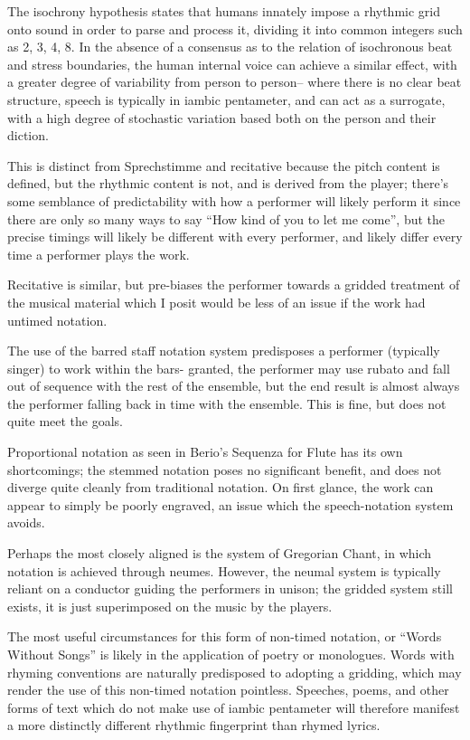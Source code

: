 The isochrony hypothesis states that humans innately impose a rhythmic grid onto sound in order to parse and process it, dividing it into common integers such as 2, 3, 4, 8. 
In the absence of a consensus as to the relation of isochronous beat and stress boundaries, the human internal voice can achieve a similar effect, with a greater degree of variability from person to person-- 
where there is no clear beat structure, speech is typically in iambic pentameter, and can act as a surrogate, with a high degree of stochastic variation based both on the person and their diction. 

This is distinct from Sprechstimme and recitative because the pitch content is defined, but the rhythmic content is not, and is derived from the player; 
there's some semblance of predictability with how a performer will likely perform it since there are only so many ways to say ``How kind of you to let me come'', but the precise timings will likely be different with every performer, and likely differ every time a performer plays the work. 

Recitative is similar, but pre-biases the performer towards a gridded treatment of the musical material which I posit would be less of an issue if the work had untimed notation. 

The use of the barred staff notation system predisposes a performer (typically singer) to work within the bars- granted, the performer may use rubato and fall out of sequence with the rest of the ensemble, but the end result is almost always the performer falling back in time with the ensemble. 
This is fine, but does not quite meet the goals.

Proportional notation as seen in Berio's Sequenza for Flute has its own shortcomings; the stemmed notation poses no significant benefit, and does not diverge quite cleanly from traditional notation. 
On first glance, the work can appear to simply be poorly engraved, an issue which the speech-notation system avoids.

Perhaps the most closely aligned is the system of Gregorian Chant, in which notation is achieved through neumes. 
However, the neumal system is typically reliant on a conductor guiding the performers in unison; the gridded system still exists, it is just superimposed on the music by the players.

The most useful circumstances for this form of non-timed notation, or ``Words Without Songs'' is likely in the application of poetry or monologues. 
Words with rhyming conventions are naturally predisposed to adopting a gridding, which may render the use of this non-timed notation pointless. 
Speeches, poems, and other forms of text which do not make use of iambic pentameter will therefore manifest a more distinctly different rhythmic fingerprint than rhymed lyrics. 

